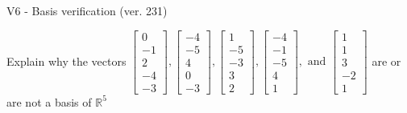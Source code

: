 \begin{exercise}
  \begin{exerciseTitle}V6 - Basis verification (ver. 231)\end{exerciseTitle}
  \begin{exerciseStatement}
    Explain why the vectors \(\left[\begin{array}{r}
0 \\
-1 \\
2 \\
-4 \\
-3
\end{array}\right] , \left[\begin{array}{r}
-4 \\
-5 \\
4 \\
0 \\
-3
\end{array}\right] , \left[\begin{array}{r}
1 \\
-5 \\
-3 \\
3 \\
2
\end{array}\right] , \left[\begin{array}{r}
-4 \\
-1 \\
-5 \\
4 \\
1
\end{array}\right] , \text{ and } \left[\begin{array}{r}
1 \\
1 \\
3 \\
-2 \\
1
\end{array}\right]\) are or are not a basis of \(\mathbb{R}^5\)	



\end{exerciseStatement}
\end{exercise}
